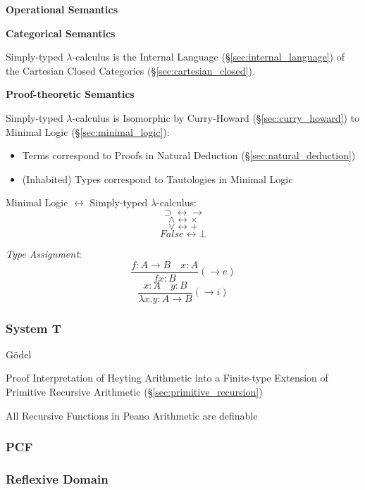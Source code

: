 \textbf{Operational Semantics}

\textbf{Categorical Semantics}

Simply-typed $\lambda$-calculus is the Internal Language
(\S\ref{sec:internal_language}) of the Cartesian Closed Categories
(\S\ref{sec:cartesian_closed}).



\textbf{Proof-theoretic Semantics}

Simply-typed $\lambda$-calculus is Isomorphic by Curry-Howard
(\S\ref{sec:curry_howard}) to Minimal Logic
(\S\ref{sec:minimal_logic}):
\begin{itemize}
  \item Terms correspond to Proofs in Natural Deduction
    (\S\ref{sec:natural_deduction})
  \item (Inhabited) Types correspond to Tautologies in Minimal Logic
\end{itemize}



Minimal Logic $\leftrightarrow$ Simply-typed $\lambda$-calculus:
\[
  \supset \leftrightarrow \rightarrow
\] \[
  \wedge \leftrightarrow \times
\] \[
  \vee \leftrightarrow +
\] \[
  False \leftrightarrow \bot
\]



\emph{Type Assignment}:
\[
  \frac{
    f:A \rightarrow B \quad x:A
  }{
    f x : B
  }(\rightarrow e)
\]\[
  \frac{
    x:A \quad y:B
  }{
    \lambda x.y : A \rightarrow B
  }(\rightarrow i)
\]



\subsubsection{System T}\label{sec:system_t}

G\"odel

Proof Interpretation of Heyting Arithmetic into a Finite-type
Extension of Primitive Recursive Arithmetic
(\S\ref{sec:primitive_recursion})

All Recursive Functions in Peano Arithmetic are definable



\subsubsection{PCF}\label{sec:pcf}



\subsubsection{Reflexive Domain}\label{sec:reflexive_domain}

